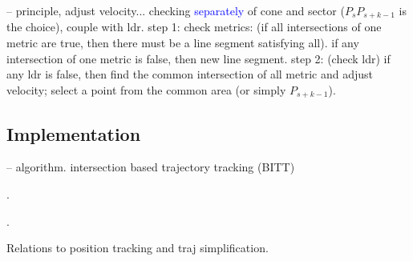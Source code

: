 -- principle, adjust velocity...
	checking \textcolor{blue}{separately} of cone and sector ($P_sP_{s+k-1}$ is the choice), couple with ldr.
	step 1: check metrics: (if all intersections of one metric are true, then there must be a line segment satisfying all).
	if any intersection of one metric is false, then new line segment.
	step 2:	(check ldr) if any ldr is false, then find the common intersection of all metric and adjust velocity; select a point from the common area (or simply $P_{s+k-1}$).

\subsection{Implementation}
-- algorithm. intersection based trajectory tracking (BITT)

\begin{example}
	\todo.
\end{example}

 \todo.


 Relations to position tracking and traj simplification.

